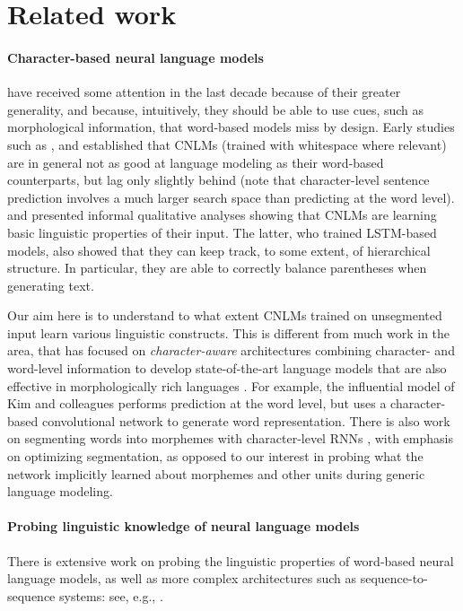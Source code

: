 \section{Related work}
\label{sec:related}

\paragraph{Character-based neural language models} have received some attention in the last
decade because of their greater generality, and because, intuitively, they should be able to
use cues, such as morphological information, that word-based models
miss by design. Early studies such as ,
 and  established
that CNLMs (trained with whitespace where relevant) are in general not
as good at language modeling as their word-based counterparts, but lag
only slightly behind (note that character-level sentence prediction
involves a much larger search space than predicting at the word
level).  and 
presented informal qualitative analyses showing that CNLMs are
learning basic linguistic properties of their input. The latter, who
trained LSTM-based models, also showed that they can keep track, to
some extent, of hierarchical structure. In particular, they are able
to correctly balance parentheses when generating text.

Our aim here is to understand to what extent CNLMs trained on
unsegmented input learn various linguistic constructs. This is
different from much work in the area, that has focused on
\emph{character-aware} architectures combining character- and
word-level information to develop state-of-the-art language models
that are also effective in morphologically rich languages \citep[see,
e.g.,][and references
there]{Bojanowski:etal:2016,Kim:etal:2016,Gerz:etal:2018}. For
example, the influential model of Kim and colleagues performs
prediction at the word level, but uses a character-based convolutional
network to generate word representation. There is also
work on segmenting words into morphemes with character-level RNNs
\cite{Kann:etal:2016}, with emphasis on optimizing segmentation, as
opposed to our interest in probing what the network implicitly learned
about morphemes and other units during generic language
modeling.%


\paragraph{Probing linguistic knowledge of neural language models} There is extensive work on probing the linguistic properties of
word-based neural language models, as well as more complex
architectures such as sequence-to-sequence systems: see, e.g.,
.

